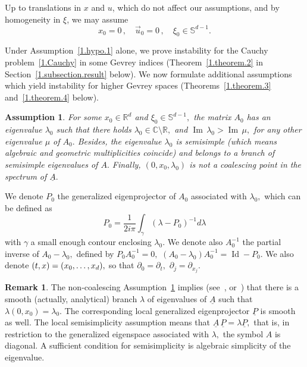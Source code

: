 \documentclass[10pt]{amsart}
\theoremstyle{definition}
\newtheorem{rema}[cdrthm]{Remark}
\theoremstyle{plain}
\newtheorem{hypo}[cdrthm]{Assumption} }
\newcommand*\R{{\mathbb R}}
\newcommand*\Cbb{{\mathbb C}}%
\newcommand{\dptl}{\partial}%
\DeclareMathOperator{\Id}{Id}
\DeclareMathOperator{\Imm}{Im}
\begin{document}
Up to translations in $x$ and $u$, which do not affect our assumptions, and by homogeneity in $\xi$, we may assume
\begin{equation}\label{1.etc}
x_0 = 0\,, \quad \vec{u}_0 = 0 \,, \quad \xi_0 \in \mathbb{S}^{d-1}.
\end{equation}

Under Assumption~\ref{1.hypo.1} alone, we prove instability for the Cauchy problem~\eqref{1.Cauchy} in some Gevrey indices (Theorem~\ref{1.theorem.2} in Section~\ref{1.subsection.result} below). We now formulate additional assumptions which yield instability for higher Gevrey spaces (Theorems~\ref{1.theorem.3} and~\ref{1.theorem.4} below).

\begin{hypo}\label{1.hypo.2}
For some $x_0 \in \R^d$ and $\xi_0 \in \mathbb{S}^{d-1},$ the matrix $A_0$ has an eigenvalue $\lambda_0$ such that there holds $\lambda_0 \in \Cbb \setminus \R,$ and ${\Imm} \, \lambda_0 > {\Imm} \, \mu,$ for any other eigenvalue $\mu$ of $A_0.$ Besides, the eigenvalue $\lambda_0$ is semisimple (which means algebraic and geometric multiplicities coincide) and belongs to a branch of semisimple eigenvalues of $A.$ Finally, $(0,x_0,\lambda_0)$ is not a coalescing point in the spectrum of $\underline A.$
\end{hypo}

\medskip

We denote $P_0$ the generalized eigenprojector of $A_0$ associated with $\lambda_0,$ which can be defined as
\[
P_0 = \frac{1}{2i\pi} \int_{\gamma} \left(\lambda - P_0\right)^{-1} d\lambda
\]
with $\gamma$ a small enough contour enclosing $\lambda_0$. We denote also $A_0^{-1}$ the partial inverse of $A_0-\lambda_0,$ defined by $P_0 A_0^{-1} = 0,$ $\left(A_0 - \lambda_0\right) A_0^{-1} = \Id - P_0.$ We also denote $(t,x)\linebreak= (x_0, \dots, x_d),$ so that $\dptl_0 = \dptl_t,$ $\dptl_j = \dptl_{x_j}.$

\begin{rema}\label{1.remark.asumm.2}
The non-coalescing Assumption~\ref{1.hypo.2} implies (see~\cite{kato2013perturbation}, or~\cite[Corollary~2.2]{texier2015rouche}) that there is a smooth (actually, analytical) branch $\lambda$ of eigenvalues of $\underline A$ such that $\lambda(0,x_0) = \lambda_0.$ The corresponding local generalized eigenprojector $\underline P$ is smooth as well. The local semisimplicity assumption means that $\underline A \,\underline P = \lambda \underline P,$ that is, in restriction to the generalized eigenspace associated with $\lambda,$ the symbol $A$ is diagonal. A sufficient condition for semisimplicity is algebraic simplicity of the eigenvalue.
\end{rema}
\end{document}

